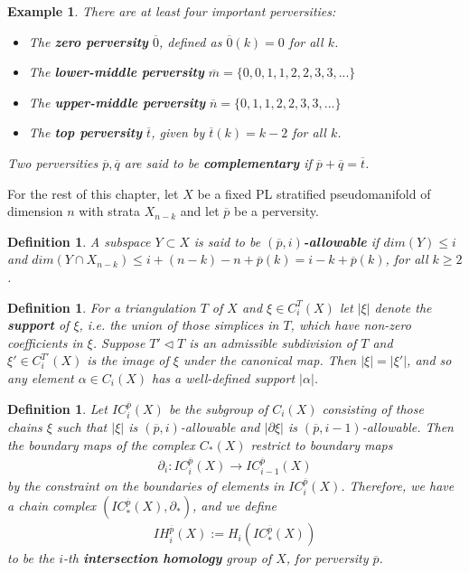 \documentclass{scrreprt}
\newtheorem{definition}[prop]{Definition}
\newtheorem{example}[prop]{Example}
\begin{document}
\begin{example}
There are at least four important perversities:
\begin{itemize}
\item The \textbf{zero perversity} $\overline{0}$, defined as $\overline{0}(k)=0$ for all $k$.
\item The \textbf{lower-middle perversity} $\overline{m}= \{ 0,0,1,1,2,2,3,3,... \}$
\item The \textbf{upper-middle perversity} $\overline{n}= \{ 0,1,1,2,2,3,3,... \}$
\item The \textbf{top perversity} $\overline{t}$, given by $\overline{t}(k)=k-2$ for all $k$.
\end{itemize}
Two perversities $\overline{p}, \overline{q}$ are said to be \textbf{complementary} if $\overline{p}+ \overline{q}= \overline{t}$.
\end{example}


For the rest of this chapter, let $X$ be a fixed PL stratified pseudomanifold of dimension $n$ with strata $X_{n-k}$  and let $\overline{p}$ be a perversity.

\begin{definition}
A subspace $Y \subset X$ is said to be \textbf{$(\overline{p},i)$-allowable} if $dim(Y) \leq i$ and $dim(Y \cap X_{n-k}) \leq i+(n-k)-n+ \overline{p}(k)=i-k+\overline{p}(k)$, for all $k \geq 2$.
\end{definition}

\begin{definition}
For a triangulation $T$ of $X$ and $\xi \in C_i^T(X)$ let $|\xi|$ denote the \textbf{support} of $\xi$, i.e. the union of those simplices in $T$, which have non-zero coefficients in $\xi$. Suppose $T' \lhd T$ is an admissible subdivision of $T$ and $\xi' \in C_i^{T'}(X)$ is the image of $\xi$ under the canonical map. Then $|\xi|=|\xi'|$, and so any element $\alpha \in C_i(X)$ has a well-defined support $|\alpha|$.
\end{definition}

\begin{definition}
Let $IC_i^{\overline{p}}(X)$ be the subgroup of $C_i(X)$ consisting of those chains $\xi$ such that $|\xi|$ is $(\overline{p},i)$-allowable and $|\partial \xi|$ is $(\overline{p},i-1)$-allowable. Then the boundary maps of the complex $C_*(X)$ restrict to boundary maps
\begin{align*}
\partial_i : IC_i^{\overline{p}}(X) \to IC_{i-1}^{\overline{p}}(X)
\end{align*}
by the constraint on the boundaries of elements in $IC_i^{\overline{p}}(X)$. Therefore, we have a chain complex $(IC_*^{\overline{p}}(X),\partial_*)$, and we define
\begin{align*}
IH_i^{\overline{p}}(X):=H_i(IC_*^{\overline{p}}(X))
\end{align*}
to be the $i$-th \textbf{intersection homology} group of $X$, for perversity $\overline{p}$.
\end{definition}
\end{document}

